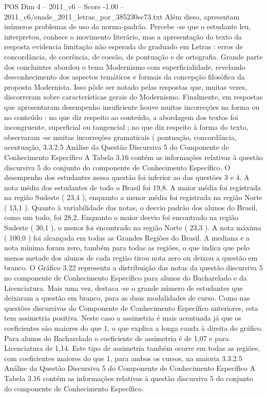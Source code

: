 \begin{textsample}{POS Dim 4 – 2011\_c6 – Score -1.00 – 2011\_c6/enade\_2011\_letras\_por\_385230ec73.txt}
Além disso, apresentam inúmeros problemas de uso da norma-padrão.
Percebe -se que o estudante leu, interpretou, conhece o movimento literário, mas a apresentação do texto da resposta evidencia limitação não esperada do graduado em Letras : erros de concordância, de coerência, de coesão, de pontuação e de ortografia.
Grande parte dos concluintes abordou o tema Modernismo com superficialidade, revelando desconhecimento dos aspectos temáticos e formais da concepção filosófica da proposta Modernista.
Isso pôde ser notado pelas respostas que, muitas vezes, discorreram sobre características gerais do Modernismo.
Finalmente, em respostas que apresentaram desempenho insuficiente houve muitas incorreções na forma ou no conteúdo : no que diz respeito ao conteúdo, a abordagem dos textos foi incongruente, superficial ou tangencial ; no que diz respeito à forma do texto, observaram -se muitas incorreções gramaticais ( pontuação, concordância, acentuação, 3.3.2.5 Análise da Questão Discursiva 5 do Componente de Conhecimento Específico A Tabela 3.16 contém as informações relativas à questão discursiva 5 do conjunto do componente de Conhecimento Específico.
O desempenho dos estudantes nessa questão foi inferior ao das questões 3 e 4.
A nota média dos estudantes de todo o Brasil foi 19,8.
A maior média foi registrada na região Sudeste ( 23,4 ), enquanto a menor média foi registrada na região Norte ( 13,1 ).
Quanto à variabilidade das notas, o desvio padrão dos alunos do Brasil, como um todo, foi 28,2.
Enquanto o maior desvio foi encontrado na região Sudeste ( 30,1 ), o menor foi encontrado na região Norte ( 23,3 ).
A nota máxima ( 100,0 ) foi alcançada em todas as Grandes Regiões do Brasil.
A mediana e a nota mínima foram zero, também para todas as regiões, o que indica que pelo menos metade dos alunos de cada região tirou nota zero ou deixou a questão em branco.
O Gráfico 3.22 representa a distribuição das notas da questão discursiva 5 no componente de Conhecimento Específico para alunos do Bacharelado e da Licenciatura.
Mais uma vez, destaca -se o grande número de estudantes que deixaram a questão em branco, para as duas modalidades de curso.
Como nas questões discursivas do Componente de Conhecimento Específico anteriores, esta tem assimetria positiva.
Neste caso a assimetria é mais acentuada já que os coeficientes são maiores do que 1, o que explica a longa cauda à direita do gráfico.
Para alunos do Bacharelado o coeficiente de assimetria é de 1,07 e para Licenciatura de 1,14.
Este tipo de assimetria também ocorre em todas as regiões, com coeficientes maiores do que 1, para ambos os cursos, na maioria 3.3.2.5 Análise da Questão Discursiva 5 do Componente de Conhecimento Específico A Tabela 3.16 contém as informações relativas à questão discursiva 5 do conjunto do componente de Conhecimento Específico.

\end{textsample}
